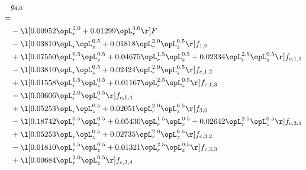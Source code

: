 \begin{alignat}{2} 
\label{eq:g_40_0} 
& g_{4,0} \nonumber \\ 
 = \\ 
& - \l[  0.00952 \opL_r^{2.0} +  0.01299 \opL_r^{3.0}  \r] F \nonumber \\ 
& - \l[  0.03810 \opL_r \opL_z^{0.5} +  0.01818 \opL_r^{2.0} \opL_z^{0.5}  \r] f_{1,0} \nonumber \\ 
& + \l[  0.07550 \opL_r^{0.5} \opL_z^{0.5} +  0.04675 \opL_r^{1.5} \opL_z^{0.5} +  0.02334 \opL_r^{2.5} \opL_z^{0.5}  \r] f_{c,1,1} \nonumber \\ 
& - \l[  0.03810 \opL_r \opL_z^{0.5} +  0.02424 \opL_r^{2.0} \opL_z^{0.5}  \r] f_{c,1,2} \nonumber \\ 
& + \l[  0.01558 \opL_r^{1.5} \opL_z^{0.5} +  0.01167 \opL_r^{2.5} \opL_z^{0.5}  \r] f_{c,1,3} \nonumber \\ 
& - \l[  0.00606 \opL_r^{2.0} \opL_z^{0.5}  \r] f_{c,1,4} \nonumber \\ 
& + \l[  0.05253 \opL_r \opL_z^{0.5} +  0.02051 \opL_r^{2.0} \opL_z^{0.5}  \r] f_{3,0} \nonumber \\ 
& - \l[  0.18742 \opL_r^{0.5} \opL_z^{0.5} +  0.05430 \opL_r^{1.5} \opL_z^{0.5} +  0.02642 \opL_r^{2.5} \opL_z^{0.5}  \r] f_{c,3,1} \nonumber \\ 
& + \l[  0.05253 \opL_r \opL_z^{0.5} +  0.02735 \opL_r^{2.0} \opL_z^{0.5}  \r] f_{c,3,2} \nonumber \\ 
& - \l[  0.01810 \opL_r^{1.5} \opL_z^{0.5} +  0.01321 \opL_r^{2.5} \opL_z^{0.5}  \r] f_{c,3,3} \nonumber \\ 
& + \l[  0.00684 \opL_r^{2.0} \opL_z^{0.5}  \r] f_{c,3,4} \nonumber \\ 
\end{alignat} 


